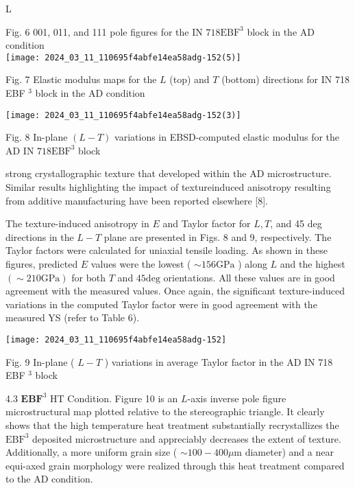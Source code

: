 \documentclass[10pt]{article}
\begin{document}
L

Fig. 6 001, 011, and 111 pole figures for the IN $718 \mathrm{EBF}^{3}$ block in the AD condition\\
\texttt{[image: 2024\_03\_11\_110695f4abfe14ea58adg-152(5)]}

Fig. 7 Elastic modulus maps for the $L$ (top) and $T$ (bottom) directions for IN 718 EBF $^{3}$ block in the AD condition

\begin{center}
\texttt{[image: 2024\_03\_11\_110695f4abfe14ea58adg-152(3)]}
\end{center}

Fig. 8 In-plane $(L-T)$ variations in EBSD-computed elastic modulus for the AD IN $718 \mathrm{EBF}^{3}$ block

strong crystallographic texture that developed within the AD microstructure. Similar results highlighting the impact of textureinduced anisotropy resulting from additive manufacturing have been reported elsewhere [8].

The texture-induced anisotropy in $E$ and Taylor factor for $L, T$, and 45 deg directions in the $L-T$ plane are presented in Figs. 8 and 9, respectively. The Taylor factors were calculated for uniaxial tensile loading. As shown in these figures, predicted $E$ values were the lowest ( $\sim 156 \mathrm{GPa}$ ) along $L$ and the highest $(\sim 210 \mathrm{GPa})$ for both $T$ and $45 \mathrm{deg}$ orientations. All these values are in good agreement with the measured values. Once again, the significant texture-induced variations in the computed Taylor factor were in good agreement with the measured YS (refer to Table 6).

\begin{center}
\texttt{[image: 2024\_03\_11\_110695f4abfe14ea58adg-152]}
\end{center}

Fig. 9 In-plane ( $L-T$ ) variations in average Taylor factor in the AD IN 718 EBF $^{3}$ block

4.3 $\mathbf{E B F}^{3}$ HT Condition. Figure 10 is an $L$-axis inverse pole figure microstructural map plotted relative to the stereographic triangle. It clearly shows that the high temperature heat treatment substantially recrystallizes the $\mathrm{EBF}^{3}$ deposited microstructure and appreciably decreases the extent of texture. Additionally, a more uniform grain size ( $\sim 100-400 \mu \mathrm{m}$ diameter) and a near equi-axed grain morphology were realized through this heat treatment compared to the AD condition.
\end{document}
